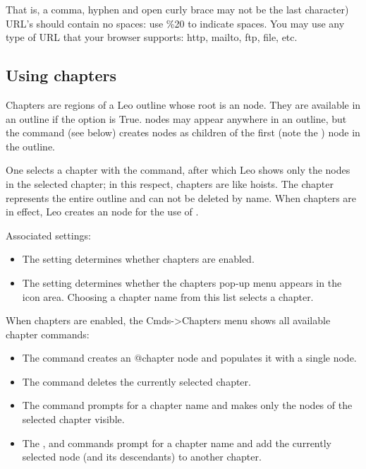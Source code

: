 \documentclass[a4paper,10pt,english]{sphinxmanual}
\begin{document}
That is, a comma, hyphen and open curly brace may not be the last character)
URL's should contain no spaces: use \%20 to indicate spaces. You may use any
type of URL that your browser supports: http, mailto, ftp, file, etc.


\subsection{Using chapters}
\label{commands:using-chapters}
Chapters are regions of a Leo outline whose root is an  node. They
are available in an outline if the  option is True.
 nodes may appear anywhere in an outline, but the 
command (see below) creates  nodes as children of the first
 (note the ) node in the outline.

One selects a chapter with the  command, after which Leo shows
only the nodes in the selected chapter; in this respect, chapters are like
hoists. The  chapter represents the entire outline and can not be
deleted by name. When chapters are in effect, Leo creates an  node
for the use of .

Associated settings:
\begin{itemize}
\item {} 
The  setting determines whether chapters are enabled.

\item {} 
The  setting determines whether the chapters
pop-up menu appears in the icon area. Choosing a chapter name from this list selects a chapter.

\end{itemize}

When chapters are enabled, the Cmds-\textgreater{}Chapters menu shows all available chapter commands:
\begin{itemize}
\item {} 
The  command creates an @chapter node and populates it with a single node.

\item {} 
The  command deletes the currently selected chapter.

\item {} 
The  command prompts for a chapter name and makes only the nodes of the selected chapter visible.

\item {} 
The ,  and  commands
prompt for a chapter name and add the currently selected node (and its descendants) to another chapter.

\end{itemize}
\end{document}
